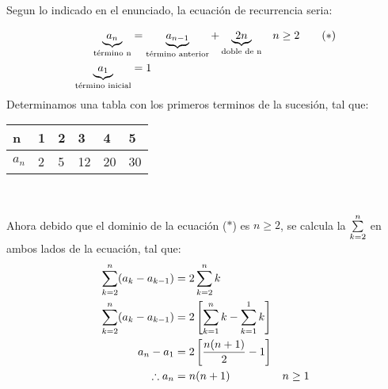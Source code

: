 
\begin{solution}
  Segun lo indicado en el enunciado, la ecuación de recurrencia seria:
  
  \begin{align*}
    \underbrace{a_{n}}_{\text{\normalfont término n}}  &= 
    \underbrace{a_{n-1}}_{\text{\normalfont término anterior}} + 
    \underbrace{2n}_{\text{\normalfont doble de n}} & n \ge 2 \tag{$\ast$}\\
    \underbrace{a_1}_{\text{\normalfont término inicial}}&= 1
  \end{align*}
  Determinamos una tabla con los primeros terminos de la sucesión, tal que:
  \begin{center}
    \begin{tabular}{@{}llllll@{}}
        \toprule
        n & 1 & 2 & 3  & 4  & 5  \\ \midrule
        $a_n$ & 2 & 5 & 12 & 20 & 30 \\ 
        \bottomrule
    \end{tabular}\\
  \end{center}
  \newpage
  Ahora debido que el dominio de la ecuación ($\ast$) es $n \ge 2$, se calcula la $\sum\limits_{k=2}^{n}$ en ambos lados de la ecuación, tal que:
  \begin{align*}
      \sum\limits_{k=2}^{n} (a_k - a_{k-1})  &= 2\sum\limits_{k=2}^{n}k  \\
      \sum\limits_{k=2}^{n} (a_k - a_{k-1})  &= 2\left[\sum\limits_{k=1}^{n}k - \sum\limits_{k=1}^{1}k \right] \\
      a_n - a_1 &= 2 \left[ \frac{n(n+1)}{2}-1\right] \\
      \therefore a_n &= n(n+1) & n\ge 1
  \end{align*}
\end{solution}